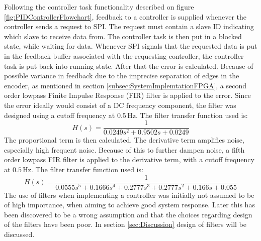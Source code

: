 \documentclass[../../main.tex]{subfiles}
\begin{document}
Following the controller task functionality described on figure  \ref{fig:PIDControllerFlowchart}, feedback to a controller is supplied whenever the controller sends a request to SPI. The request must contain a slave ID indicating which slave to receive data from. The controller task is then put in a blocked state, while waiting for data. Whenever SPI signals that the requested data is put in the feedback buffer associated with the requesting controller, the controller task is put back into running state. After that the error is calculated. Because of possible variance in feedback due to the imprecise separation of edges in the encoder, as mentioned in section \ref{subsec:SystemImplemtationFPGA}, a second order lowpass Finite Impulse Response (FIR) filter is applied to the error. Since the error ideally would consist of a DC frequency component, the filter was designed using a cutoff frequency at $0.5\,\mathrm{Hz}$. The filter transfer function used is:
\begin{equation}
    H(s) = \frac{1}{0.0249s^2 + 0.9502s + 0.0249}
\end{equation}
The proportional term is then calculated.
The derivative term amplifies noise, especially high frequent noise. Because of this to further dampen noise, a fifth order lowpass FIR filter is applied to the derivative term, with a cutoff frequency at $0.5\,\mathrm{Hz}$. The filter transfer function used is:
\begin{equation}
    H(s) = \frac{1}{0.0555s^5 + 0.1666s^4 + 0.2777s^3 + 0.2777s^2 + 0.166s + 0.055}
\end{equation}
The use of filters when implementing a controller was initially not assumed to be of high importance, when aiming to achieve good system response. Later this has been discovered to be a wrong assumption and that the choices regarding design of the filters have been poor. In section \ref{sec:Discussion} design of filters will be discussed. \\



\end{document}
